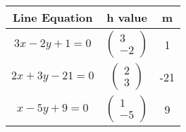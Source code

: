 \begin{tabular}{|c|c|c|}
\hline
\textbf{Line Equation} & \textbf{h value} & \textbf{m}\\
\hline
$3x - 2y + 1 = 0$ & $\left( \begin{array}{c} 3 \\ -2 \end{array} \right)$ & 1 \\
\hline
$2x + 3y - 21 = 0$ & $\left( \begin{array}{c} 2 \\ 3 \end{array} \right)$ & -21 \\
\hline
$x - 5y + 9 = 0$ & $\left( \begin{array}{c} 1 \\ -5 \end{array} \right)$ & 9 \\
\hline
\end{tabular}


